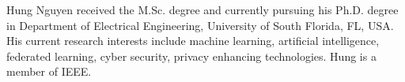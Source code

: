 \documentclass[journal]{IEEEtai}
\begin{document}
\begin{IEEEbiography}{Hung Nguyen}
	received the M.Sc. degree and currently pursuing his Ph.D. degree in Department of Electrical Engineering, University of South Florida, FL, USA. His current research interests include machine learning, artificial intelligence, federated learning, cyber security, privacy enhancing technologies. Hung is a member of IEEE.
\end{IEEEbiography}
\end{document}
